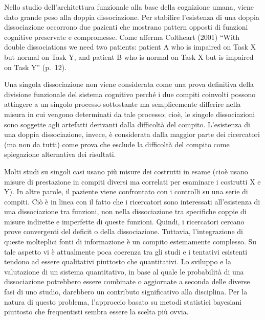 \documentclass[
  11pt,
]{krantz}
\theoremstyle{definition}
\theoremstyle{definition}
\theoremstyle{definition}
\theoremstyle{definition}
\theoremstyle{remark}
\begin{document}
Nello studio dell'architettura funzionale alla base della cognizione umana, viene dato grande peso alla doppia dissociazione. Per stabilire l'esistenza di una doppia dissociazione occorrono due pazienti che mostrano pattern opposti di funzioni cognitive preservate e compromesse. Come afferma Coltheart (2001) ``With double dissociations we need two patients: patient A who is impaired on Task X but normal on Task Y, and patient B who is normal on Task X but is impaired on Task Y'' (p.~12).

Una singola dissociazione non viene considerata come una prova definitiva della divisione funzionale del sistema cognitivo perché i due compiti coinvolti possono attingere a un singolo processo sottostante ma semplicemente differire nella misura in cui vengono determinati da tale processo; cioè, le singole dissociazioni sono soggette agli artefatti derivanti dalla difficoltà del compito. L'esistenza di una doppia dissociazione, invece, è considerata dalla maggior parte dei ricercatori (ma non da tutti) come prova che esclude la difficoltà del compito come spiegazione alternativa dei risultati.

Molti studi su singoli casi usano più misure dei costrutti in esame (cioè usano misure di prestazione in compiti diversi ma correlati per esaminare i costrutti X e Y). In altre parole, il paziente viene confrontato con i controlli su una serie di compiti. Ciò è in linea con il fatto che i ricercatori sono interessati all'esistenza di una dissociazione tra funzioni, non nella dissociazione tra specifiche coppie di misure indirette e imperfette di queste funzioni. Quindi, i ricercatori cercano prove convergenti del deficit o della dissociazione. Tuttavia, l'integrazione di queste molteplici fonti di informazione è un compito estemamente complesso. Su tale aspetto vi è attualmente poca coerenza tra gli studi e i tentativi esistenti tendono ad essere qualitativi piuttosto che quantitativi. Lo sviluppo e la valutazione di un sistema quantitativo, in base al quale le probabilità di una dissociazione potrebbero essere combinate o aggiornate a seconda delle diverse fasi di uno studio, darebbero un contributo significativo alla disciplina. Per la natura di questo problema, l'approccio basato su metodi statistici bayesiani piuttosto che frequentisti sembra essere la scelta più ovvia.
\end{document}
